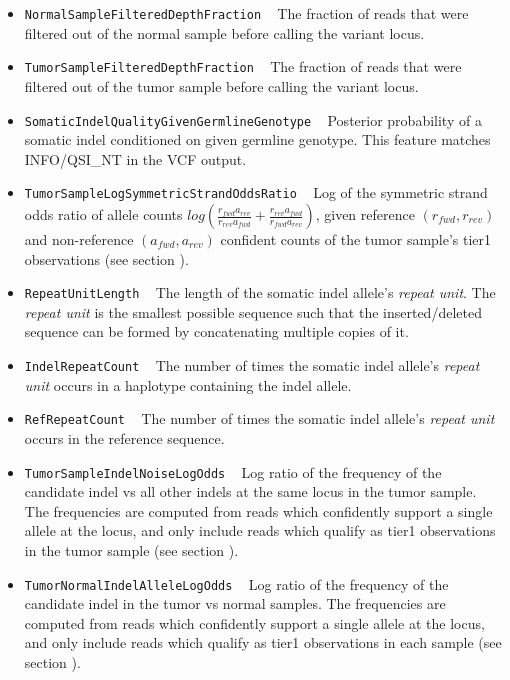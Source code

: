 \documentclass{article}
\begin{document}
\begin{itemize}
    \item \texttt{NormalSampleFilteredDepthFraction} ~ The fraction of reads that were filtered out of the normal sample before calling the variant locus.

    \item \texttt{TumorSampleFilteredDepthFraction} ~ The fraction of reads that were filtered out of the tumor sample before calling the variant locus.

    \item \texttt{SomaticIndelQualityGivenGermlineGenotype} ~ Posterior probability of a somatic indel conditioned on given germline genotype. This feature matches INFO/QSI\_NT in the VCF output.

    \item \texttt{TumorSampleLogSymmetricStrandOddsRatio} ~ Log of the symmetric strand odds ratio of allele counts $log{\left( \frac{r_{fwd} a_{rev}} {r_{rev} a_{fwd}} + \frac{r_{rev} a_{fwd}} {r_{fwd} a_{rev}}\right)}$, given reference $(r_{fwd},r_{rev})$ and non-reference $(a_{fwd},a_{rev})$ confident counts of the tumor sample's tier1 observations (see section ).

    \item \texttt{RepeatUnitLength} ~ The length of the somatic indel allele's \emph{repeat unit}. The \emph{repeat unit} is the smallest possible sequence such that the inserted/deleted sequence can be formed by concatenating multiple copies of it.

    \item \texttt{IndelRepeatCount} ~ The number of times the somatic indel allele's \emph{repeat unit} occurs in a haplotype containing the indel allele.

    \item \texttt{RefRepeatCount} ~ The number of times the somatic indel allele's \emph{repeat unit} occurs in the reference sequence.

    \item \texttt{TumorSampleIndelNoiseLogOdds} ~ Log ratio of the frequency of the candidate indel vs all other indels at the same locus in the tumor sample. The frequencies are computed from reads which confidently support a single allele at the locus, and only include reads which qualify as tier1 observations in the tumor sample (see section ).

    \item \texttt{TumorNormalIndelAlleleLogOdds} ~ Log ratio of the frequency of the candidate indel in the tumor vs normal samples. The frequencies are computed from reads which confidently support a single allele at the locus, and only include reads which qualify as tier1 observations in each sample (see section ).


\end{itemize}
\end{document}
